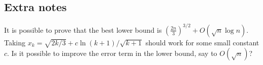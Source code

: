 \subsection*{Extra notes}

It is possible to prove that the best lower bound is $\left(\frac{2n}{3}\right)^{3/2} + O(\sqrt{n} \log n)$.
Taking $x_k = \sqrt{2k/3} + c \ln (k + 1)/\sqrt{k + 1}$ should work for some small constant $c$.
Is it possible to improve the error term in the lower bound, say to $O(\sqrt{n})$?
